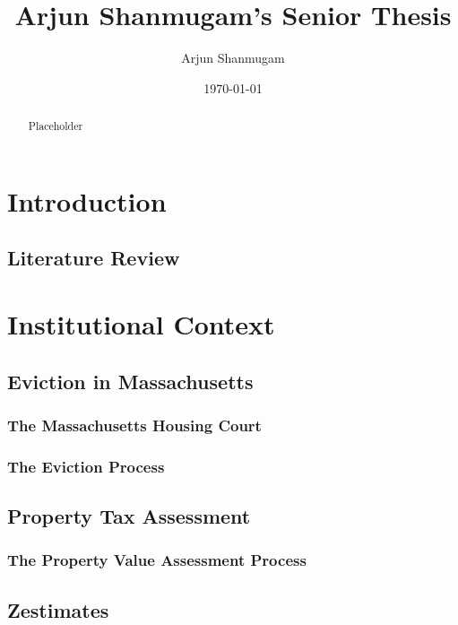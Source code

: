 \documentclass[12pt]{article}
\begin{document}
\begin{titlepage}
\title{Arjun Shanmugam's Senior Thesis}
\author{Arjun Shanmugam}
\date{\today}
\maketitle
\begin{abstract}
\noindent Placeholder\\

\bigskip
\end{abstract}
\setcounter{page}{0}
\thispagestyle{empty}
\end{titlepage}
\pagebreak \newpage

\doublespacing

\section{Introduction} \label{sec:introduction}

\subsection{Literature Review}

\section{Institutional Context}
    \subsection{Eviction in Massachusetts}
        \subsubsection{The Massachusetts Housing Court}
        \subsubsection{The Eviction Process}
    \subsection{Property Tax Assessment}
        \subsubsection{The Property Value Assessment Process}
    \subsection{Zestimates}
\end{document}
